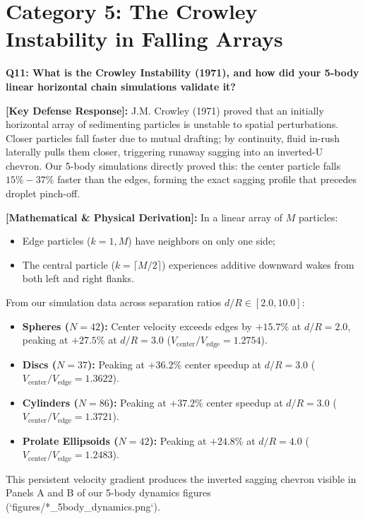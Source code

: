 \documentclass[11pt,a4paper]{article}
\newcommand{\question}[2]{
    \vspace{0.4cm}
    \noindent\colorbox{blue!10}{\parbox{\dimexpr\textwidth-2\fboxsep\relax}{
        \textbf{#1: #2}
    }}
    \vspace{0.2cm}
}
\newcommand{\shortanswer}[1]{
    \noindent\textbf{\textcolor{green!50!black}{[Key Defense Response]:}} #1
    \vspace{0.2cm}
}
\newcommand{\deepdetails}[1]{
    \noindent\textbf{\textcolor{blue!60!black}{[Mathematical \& Physical Derivation]:}} #1
    \vspace{0.2cm}
}
\begin{document}
\section{Category 5: The Crowley Instability in Falling Arrays}

\question{Q11}{What is the Crowley Instability (1971), and how did your 5-body linear horizontal chain simulations validate it?}

\shortanswer{J.M. Crowley (1971) proved that an initially horizontal array of sedimenting particles is unstable to spatial perturbations. Closer particles fall faster due to mutual drafting; by continuity, fluid in-rush laterally pulls them closer, triggering runaway sagging into an inverted-U chevron. Our 5-body simulations directly proved this: the center particle falls $15\% - 37\%$ faster than the edges, forming the exact sagging profile that precedes droplet pinch-off.}

\deepdetails{
In a linear array of $M$ particles:
\begin{itemize}
    \item Edge particles ($k=1, M$) have neighbors on only one side;
    \item The central particle ($k = \lceil M/2 \rceil$) experiences additive downward wakes from both left and right flanks.
\end{itemize}
From our simulation data across separation ratios $d/R \in [2.0, 10.0]$:
\begin{itemize}
    \item \textbf{Spheres ($N = 42$):} Center velocity exceeds edges by $+15.7\%$ at $d/R = 2.0$, peaking at $+27.5\%$ at $d/R = 3.0$ ($V_{\text{center}} / V_{\text{edge}} = 1.2754$).
    \item \textbf{Discs ($N = 37$):} Peaking at $+36.2\%$ center speedup at $d/R = 3.0$ ($V_{\text{center}} / V_{\text{edge}} = 1.3622$).
    \item \textbf{Cylinders ($N = 86$):} Peaking at $+37.2\%$ center speedup at $d/R = 3.0$ ($V_{\text{center}} / V_{\text{edge}} = 1.3721$).
    \item \textbf{Prolate Ellipsoids ($N = 42$):} Peaking at $+24.8\%$ at $d/R = 4.0$ ($V_{\text{center}} / V_{\text{edge}} = 1.2483$).
\end{itemize}
This persistent velocity gradient produces the inverted sagging chevron visible in Panels A and B of our 5-body dynamics figures (`figures/*_5body_dynamics.png`).
}
\end{document}

